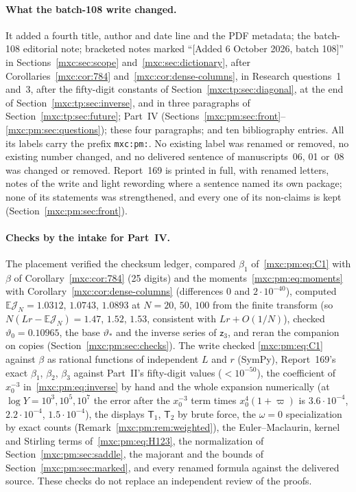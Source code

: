 \documentclass[11pt]{article}
\numberwithin{equation}{section}
\theoremstyle{definition}
\theoremstyle{remark}
\newcommand{\E}{\mathbb E}
\begin{document}
\paragraph{What the batch-108 write changed.} It added a fourth title,
author and date line and the PDF metadata; the batch-108 editorial note;
bracketed notes marked ``[Added 6 October 2026, batch 108]'' in
Sections~\ref{mxc:sec:scope} and~\ref{mxc:sec:dictionary}, after
Corollaries~\ref{mxc:cor:784} and~\ref{mxc:cor:dense-columns}, in Research
questions~1 and~3, after the fifty-digit constants of
Section~\ref{mxc:tp:sec:diagonal}, at the end of
Section~\ref{mxc:tp:sec:inverse}, and in three paragraphs of
Section~\ref{mxc:tp:sec:future}; Part~IV
(Sections~\ref{mxc:pm:sec:front}--\ref{mxc:pm:sec:questions}); these four
paragraphs; and ten bibliography entries. All its labels carry the prefix
\texttt{mxc:pm:}. No existing label was renamed or removed, no existing
number changed, and no delivered sentence of manuscripts~06, 01 or~08 was
changed or removed. Report~169 is printed in full, with renamed letters, notes
of the write and light rewording where a sentence named its own package; none
of its statements was strengthened, and every one of its non-claims is kept
(Section~\ref{mxc:pm:sec:front}).

\paragraph{Checks by the intake for Part~IV.} The placement verified the
checksum ledger, compared $\beta_1$ of~\eqref{mxc:pm:eq:C1} with $\beta$ of
Corollary~\ref{mxc:cor:784} (25 digits) and the moments~\eqref{mxc:pm:eq:moments}
with Corollary~\ref{mxc:cor:dense-columns} (differences $0$ and $2\cdot10^{-40}$),
computed $\E\mathcal J_N=1.0312$, $1.0743$, $1.0893$ at $N=20$, $50$, $100$
from the finite transform (so $N(Lr-\E\mathcal J_N)=1.47$, $1.52$, $1.53$,
consistent with $Lr+O(1/N)$), checked $\vartheta_0=0.10965$, the base
$\vartheta_*$ and the inverse series of $\mathsf z_3$, and reran the companion
on copies (Section~\ref{mxc:pm:sec:checks}). The write checked
\eqref{mxc:pm:eq:C1} against $\beta$ as rational functions of independent $L$
and $r$ (SymPy), Report~169's exact $\beta_1$, $\beta_2$, $\beta_3$ against
Part~II's fifty-digit values ($<10^{-50}$), the coefficient of $x_0^{-3}$
in~\eqref{mxc:pm:eq:inverse} by hand and the whole expansion numerically
(at $\log Y=10^3,10^5,10^7$ the error after the $x_0^{-3}$ term times
$x_0^4(1+\varpi)$ is $3.6\cdot10^{-4}$, $2.2\cdot10^{-4}$, $1.5\cdot10^{-4}$), the
displays $\mathsf T_1$, $\mathsf T_2$ by brute force, the $\omega=0$
specialization by exact counts (Remark~\ref{mxc:pm:rem:weighted}), the
Euler--Maclaurin, kernel and Stirling terms of~\eqref{mxc:pm:eq:H123}, the
normalization of Section~\ref{mxc:pm:sec:saddle}, the majorant and the bounds
of Section~\ref{mxc:pm:sec:marked}, and every renamed formula against the
delivered source. These checks do not replace an independent review of the
proofs.
\end{document}
